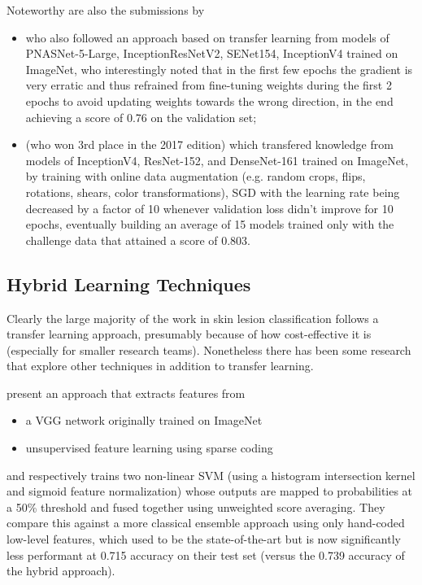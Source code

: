 Noteworthy are also the submissions by

\begin{itemize}
    \item \citeauthor{isic2018milton} \cite{isic2018milton} who also followed an approach based on transfer learning from models of PNASNet-5-Large, InceptionResNetV2, SENet154, InceptionV4 trained on ImageNet, who interestingly noted that in the first few epochs the gradient is very erratic and thus refrained from fine-tuning weights during the first 2 epochs to avoid updating weights towards the wrong direction, in the end achieving a score of 0.76 on the validation set;
    \item \citeauthor{isic2018bissoto} \cite{isic2018bissoto} (who won 3rd place in the 2017 edition) which transfered knowledge from models of InceptionV4, ResNet-152, and DenseNet-161 trained on ImageNet, by training with online data augmentation (e.g. random crops, flips, rotations, shears, color transformations), \ac{SGD} with the learning rate being decreased by a factor of 10 whenever validation loss didn't improve for 10 epochs, eventually building an average of 15 models trained only with the challenge data that attained a score of 0.803.
\end{itemize}

\subsection{Hybrid Learning Techniques}

Clearly the large majority of the work in skin lesion classification follows a transfer learning approach, presumably because of how cost-effective it is (especially for smaller research teams). Nonetheless there has been some research that explore other techniques in addition to transfer learning.

\citeauthor{hybrid2} \cite{hybrid2} present an approach that extracts features from

\begin{itemize}
    \item a \ac{VGG} network originally trained on ImageNet
    \item unsupervised feature learning using sparse coding
\end{itemize}

and respectively trains two non-linear \ac{SVM} (using a histogram intersection kernel and sigmoid feature normalization) whose outputs are mapped to probabilities at a 50\% threshold and fused together using unweighted score averaging. They compare this against a more classical ensemble approach using only hand-coded low-level features, which used to be the state-of-the-art but is now significantly less performant at 0.715 accuracy on their test set (versus the 0.739 accuracy of the hybrid approach).

